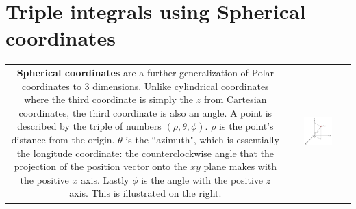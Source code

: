 \documentclass{article}
\begin{document}
\section*{Triple integrals using Spherical coordinates}

\begin{tabular}{cc}
\parbox{0.5\textwidth}{
{\bf Spherical coordinates} are a further generalization of Polar coordinates to 3 dimensions. Unlike cylindrical coordinates where the third coordinate is simply the \(z\) from Cartesian coordinates, the third coordinate is also an angle. A point is described by the triple of numbers \((\rho,\theta,\phi)\). \(\rho\) is the point's distance from the origin. \(\theta\) is the ``azimuth", which is essentially the longitude coordinate: the counterclockwise angle that the projection of the position vector onto the \(xy\) plane makes with the positive \(x\) axis. Lastly \(\phi\) is the angle with the positive \(z\) axis. This is illustrated on the right.
} & \parbox{0.5\textwidth}{
\includegraphics[width = 0.5\textwidth]{spherical_coordinates}
}
\end{tabular}
\end{document}
